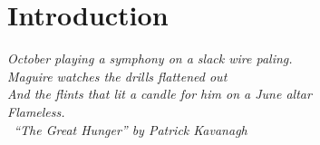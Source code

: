 \chapter{Introduction}
\textit{October playing a symphony on a slack wire paling.\\
Maguire watches the drills flattened out\\
And the flints that lit a candle for him on a June altar\\
Flameless. \\
\vspace{.5cm}
\textemdash\ ``The Great Hunger'' by Patrick Kavanagh} \citep{Kavanagh_Quinn_2006a}